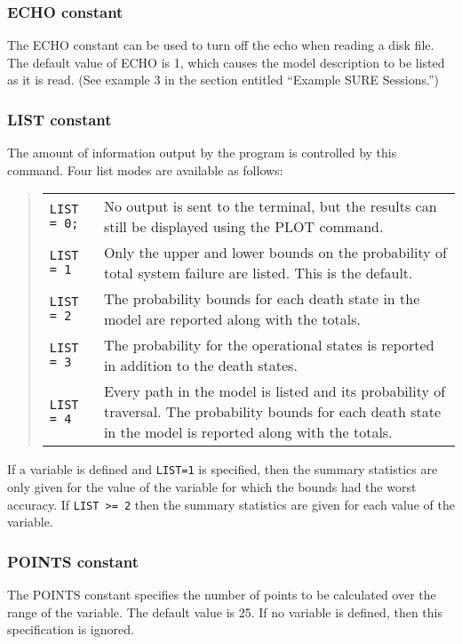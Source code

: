 \subsubsection{ECHO constant} The {\isf ECHO} constant can be used to turn off
the echo when reading a disk file.  The default value of {\isf ECHO} is 1,
which causes the model description to be listed as it is read.  (See example 3
in the section entitled ``Example SURE Sessions.'')


\subsubsection{LIST constant} The amount
of information output by the program is controlled by this command.  Four list
modes are available as follows:
\begin{quote}
\begin{tabular}{lp{5.0in}}
   \verb|LIST = 0;| & No output is sent to the terminal, but the results can still be
   displayed using the PLOT command. \\

   \verb|LIST = 1| & Only the upper and lower bounds on the probability of total
   system failure are listed.   This is the default.\\

   \verb|LIST = 2| & The probability bounds for each death state in the model are
   reported along with the totals. \\

   \verb|LIST = 3| & The probability for the operational states is
                     reported in addition to the death states. \\

   \verb|LIST = 4| & Every path in the model is listed and its probability of
   traversal.   The probability bounds for each death state in the model is
   reported along with the totals. \\
\end{tabular}
\end{quote}

If a variable is defined and \verb|LIST=1| is specified, then the summary
statistics are only given for the value of the variable for which the bounds
had the worst accuracy.  If \verb|LIST >= 2| then the summary statistics are
given for each value of the variable.

\subsubsection{POINTS constant} The {\isf POINTS}
constant specifies the number of points to be calculated over the range of the
variable.  The default value is 25.  If no variable is defined, then this
specification is ignored.


